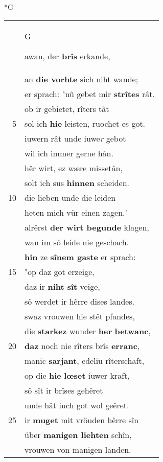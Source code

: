 \documentclass[8pt,a4paper,notitlepage]{article}
\begin{document}
\begin{table}[ht]
\begin{minipage}[t]{0.5\linewidth}
\small
\begin{center}*G
\end{center}
\begin{tabular}{rl}
 & \begin{large}G\end{large}awan, der \textbf{brîs} erkande,\\ 
 & an \textbf{die vorhte} sich niht wande;\\ 
 & er sprach: "nû gebet mir \textbf{strîtes} rât.\\ 
 & ob ir gebietet, rîters tât\\ 
5 & sol ich \textbf{hie} leisten, ruochet es got.\\ 
 & iuwern rât unde iuwe\textit{r} gebot\\ 
 & wil ich immer gerne hân.\\ 
 & hêr wirt, ez wære missetân,\\ 
 & solt ich sus \textbf{hinnen} scheiden.\\ 
10 & die lieben unde die leiden\\ 
 & heten mich vür einen zagen."\\ 
 & alrêrst \textbf{der wirt begunde} klagen,\\ 
 & wan im sô leide nie geschach.\\ 
 & \textbf{hin} ze \textbf{sînem gaste} er sprach:\\ 
15 & "op daz got erzeige,\\ 
 & daz ir \textbf{niht sît} veige,\\ 
 & sô werdet ir hêrre dises landes.\\ 
 & swaz vrouwen hie stêt pfandes,\\ 
 & die \textbf{starkez} wunder \textbf{her} \textbf{betwanc},\\ 
20 & \textbf{daz} noch nie rîters brîs \textbf{erranc},\\ 
 & manic \textbf{sarjant}, edeliu rîterschaft,\\ 
 & op die \textbf{hie} \textbf{lœset} iuwer kraft,\\ 
 & sô sît ir brîses gehêret\\ 
 & unde hât iuch got wol geêret.\\ 
25 & ir \textbf{muget} mit vröuden hêrre sîn\\ 
 & über \textbf{manigen liehten} schîn,\\ 
 & vrouwen von manigen landen.\\ 

\end{tabular}
\end{minipage}
\end{table}
\end{document}
